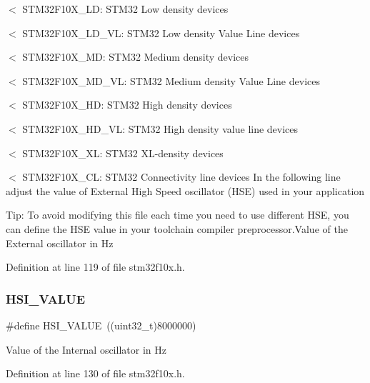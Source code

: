 $<$ S\+T\+M32\+F10\+X\+\_\+\+LD\+: S\+T\+M32 Low density devices

$<$ S\+T\+M32\+F10\+X\+\_\+\+L\+D\+\_\+\+VL\+: S\+T\+M32 Low density Value Line devices

$<$ S\+T\+M32\+F10\+X\+\_\+\+MD\+: S\+T\+M32 Medium density devices

$<$ S\+T\+M32\+F10\+X\+\_\+\+M\+D\+\_\+\+VL\+: S\+T\+M32 Medium density Value Line devices

$<$ S\+T\+M32\+F10\+X\+\_\+\+HD\+: S\+T\+M32 High density devices

$<$ S\+T\+M32\+F10\+X\+\_\+\+H\+D\+\_\+\+VL\+: S\+T\+M32 High density value line devices

$<$ S\+T\+M32\+F10\+X\+\_\+\+XL\+: S\+T\+M32 X\+L-\/density devices

$<$ S\+T\+M32\+F10\+X\+\_\+\+CL\+: S\+T\+M32 Connectivity line devices In the following line adjust the value of External High Speed oscillator (H\+SE) used in your application

Tip\+: To avoid modifying this file each time you need to use different H\+SE, you can define the H\+SE value in your toolchain compiler preprocessor.\+Value of the External oscillator in Hz 

Definition at line 119 of file stm32f10x.\+h.

\mbox{\label{group___library__configuration__section_gaaa8c76e274d0f6dd2cefb5d0b17fbc37}} 
\subsubsection{\texorpdfstring{H\+S\+I\+\_\+\+V\+A\+L\+UE}{HSI\_VALUE}}
{\footnotesize\ttfamily \#define H\+S\+I\+\_\+\+V\+A\+L\+UE~((uint32\+\_\+t)8000000)}

Value of the Internal oscillator in Hz 

Definition at line 130 of file stm32f10x.\+h.

